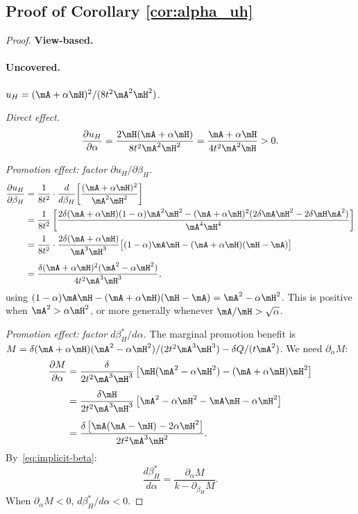 \subsection*{Proof of Corollary \ref{cor:alpha_uh}}
\begin{proof}
\textbf{View-based.}
\paragraph{Uncovered.}
$u_H = (\mA+\alpha \mH)^2/(8t^2\mA^2\mH^2)$. 
 
\textit{Direct effect.}
\[
\frac{\partial u_H}{\partial\alpha}
= \frac{2\mH(\mA+\alpha \mH)}{8t^2\mA^2\mH^2}
= \frac{\mA+\alpha \mH}{4t^2\mA^2\mH} > 0.
\]
 
\textit{Promotion effect: factor $\partial u_H/\partial\beta_H$.}
\begin{align}
\frac{\partial u_H}{\partial\beta_H}
&= \frac{1}{8t^2}\cdot\frac{d}{d\beta_H}\!\left[\frac{(\mA+\alpha\mH)^2}{\mA^2\mH^2}\right]\notag\\
&= \dfrac{1}{8t^2} \left[ \dfrac{2\delta(\mA+\alpha\mH)(1-\alpha)\mA^2\mH^2 - (\mA+\alpha\mH)^2(2\delta\mA\mH^2-2\delta\mH\mA^2)}{\mA^4\mH^4} \right]
\notag\\
&= \frac{1}{8t^2}\cdot\frac{2\delta(\mA+\alpha\mH)}{\mA^3\mH^3}\bigl[(1-\alpha)\mA\mH - (\mA+\alpha\mH)(\mH - \mA)\bigr] \notag\\[4pt]
&= \frac{\delta (\mA+\alpha\mH)^2(\mA^2 - \alpha\mH^2)}{4t^2\mA^3\mH^3},\label{eq:duc-dbeta-V}
\end{align}
using $(1-\alpha)\mA\mH - (\mA + \alpha\mH)(\mH - \mA) = \mA^2 - \alpha\mH^2$.  This is positive when $\mA^2 > \alpha\mH^2$, or more generally whenever $\mA/\mH > \sqrt{\alpha}$.
 
\textit{Promotion effect: factor $d\beta_H^*/d\alpha$.}\;
The marginal promotion benefit is $M = \delta (\mA+\alpha\mH)(\mA^2 - \alpha\mH^2)/(2t^2\mA^3\mH^3) - \delta Q/(t\mA^2)$.  We need $\partial_\alpha M$:
\begin{align}
\frac{\partial M}{\partial\alpha}
&= \frac{\delta}{2t^2\mA^3\mH^3}\left[\mH(\mA^2 - \alpha\mH^2) - (\mA+\alpha\mH)\mH^2\right] \notag\\[4pt]
&= \frac{\delta\mH}{2t^2\mA^3\mH^3}\left[\mA^2 - \alpha\mH^2 - \mA\mH - \alpha\mH^2\right] \notag\\[4pt]
&= \frac{\delta\left[\mA(\mA - \mH) - 2\alpha\mH^2\right]}{2t^2\mA^3\mH^2}. \label{eq:dPhi-dalpha-V}
\end{align}
By~\eqref{eq:implicit-beta}:
\[
\frac{d\beta_H^*}{d\alpha}
= \frac{\partial_\alpha M}{k - \partial_{\beta_H} M}.
\]
When $\partial_\alpha M < 0$, $d\beta_H^*/d\alpha < 0$.
 

\end{proof}
